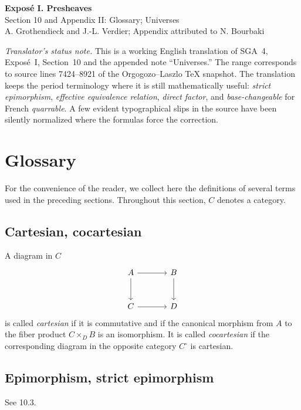 \documentclass[11pt]{article}
\begin{document}
\begin{center}
{\Large \textbf{Expos\'e I. Presheaves}}\\[0.35em]
{\large Section 10 and Appendix II: Glossary; Universes}\\[0.35em]
A. Grothendieck and J.-L. Verdier; Appendix attributed to N. Bourbaki
\end{center}

\bigskip

\noindent\emph{Translator's status note.} This is a working English translation of SGA~4, Expos\'e~I, Section~10 and the appended note ``Universes.'' The range corresponds to source lines 7424--8921 of the Orgogozo--Laszlo TeX snapshot. The translation keeps the period terminology where it is still mathematically useful: \emph{strict epimorphism}, \emph{effective equivalence relation}, \emph{direct factor}, and \emph{base-changeable} for French \emph{quarrable}. A few evident typographical slips in the source have been silently normalized where the formulas force the correction.

\setcounter{section}{9}
\section{Glossary}

For the convenience of the reader, we collect here the definitions of several terms used in the preceding sections. Throughout this section, \(C\) denotes a category.

\subsection{Cartesian, cocartesian}

A diagram in \(C\)
\[
\begin{tikzcd}[column sep=large,row sep=large]
A \arrow[r] \arrow[d] & B \arrow[d] \\
C \arrow[r] & D
\end{tikzcd}
\]
is called \emph{cartesian} if it is commutative and if the canonical morphism from \(A\) to the fiber product \(C\times_D B\) is an isomorphism. It is called \emph{cocartesian} if the corresponding diagram in the opposite category \(C^\circ\) is cartesian.

\subsection{Epimorphism, strict epimorphism}

See 10.3.
\end{document}
